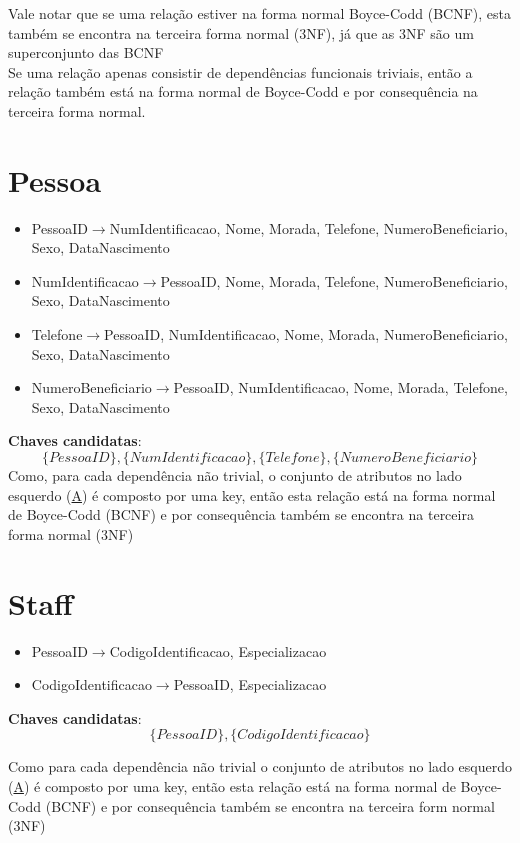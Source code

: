 \documentclass[article, a4paper, 12pt, oneside]{memoir}
\begin{document}
Vale notar que se uma relação estiver na forma normal Boyce-Codd (BCNF), esta também se encontra na terceira forma normal (3NF), já que as 3NF são um superconjunto das BCNF\\
Se uma relação apenas consistir de dependências funcionais triviais, então a relação também está na forma normal de Boyce-Codd e por consequência na terceira forma normal.

\newpage

\section*{Pessoa}
\begin{itemize}
	\item PessoaID$\rightarrow$NumIdentificacao, Nome, Morada, Telefone, NumeroBeneficiario, Sexo, DataNascimento
	\item NumIdentificacao$\rightarrow$PessoaID, Nome, Morada, Telefone, NumeroBeneficiario, Sexo, DataNascimento
	\item Telefone$\rightarrow$PessoaID, NumIdentificacao, Nome, Morada, NumeroBeneficiario, Sexo, DataNascimento
	\item NumeroBeneficiario$\rightarrow$PessoaID, NumIdentificacao, Nome, Morada, Telefone, Sexo, DataNascimento
\end{itemize}

\textbf{Chaves candidatas}:\\
\[
\{ PessoaID \}, \{ NumIdentificacao \}, \{ Telefone \}, \{ NumeroBeneficiario \}
\]
Como, para cada dependência não trivial, o conjunto de atributos no lado esquerdo (\underline{A}) é composto por uma key, então esta relação está na forma normal de Boyce-Codd (BCNF) e por consequência também se encontra na terceira forma normal (3NF)

\section*{Staff}
\begin{itemize}
	\item PessoaID$\rightarrow$CodigoIdentificacao, Especializacao
	\item CodigoIdentificacao$\rightarrow$PessoaID, Especializacao
\end{itemize}

\textbf{Chaves candidatas}:\\
\[
\{ PessoaID \}, \{ CodigoIdentificacao \}
\]

Como para cada dependência não trivial o conjunto de atributos no lado esquerdo (\underline{A}) é composto por uma key, então esta relação está na forma normal de Boyce-Codd (BCNF) e por consequência também se encontra na terceira form normal (3NF)
\end{document}
